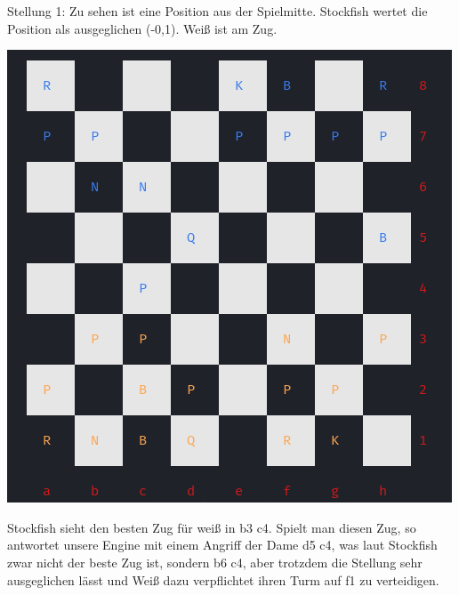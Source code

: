 \documentclass[a4paper, 12pt]{article}
\begin{document}
Stellung 1:
Zu sehen ist eine Position aus der Spielmitte. Stockfish wertet die Position als ausgeglichen (-0,1). Weiß ist am Zug.
\begin{center}
\includegraphics[scale=0.63]{images/st_2_1.png}
\label{ncurses_board}
\end{center}
Stockfish sieht den besten Zug für weiß in b3 c4. Spielt man diesen Zug, so antwortet unsere Engine mit einem Angriff der Dame d5 c4, was laut Stockfish zwar nicht der beste Zug ist, sondern b6 c4, aber trotzdem die Stellung sehr ausgeglichen lässt und Weiß dazu verpflichtet ihren Turm auf f1 zu verteidigen.
\end{document}
